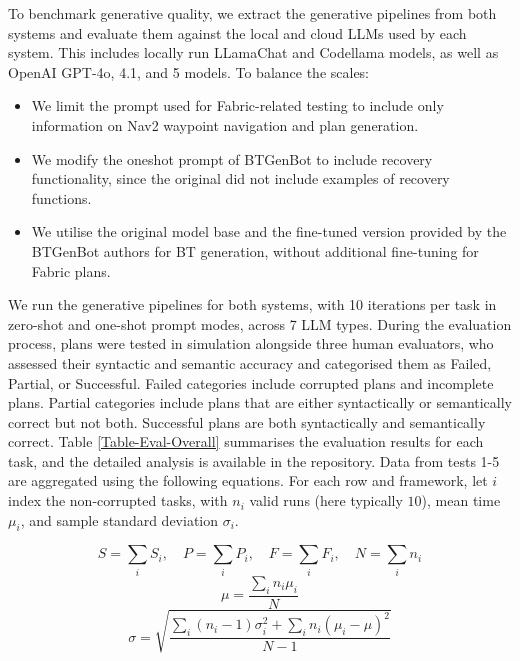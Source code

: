 \documentclass[letterpaper, 10pt, conference]{ieeeconf}      %
\begin{document}
To benchmark generative quality, we extract the generative pipelines from both systems and evaluate them against the local and cloud LLMs used by each system. This includes locally run LLamaChat and Codellama models, as well as OpenAI GPT-4o, 4.1, and 5 models. To balance the scales:

\begin{itemize}
    \item We limit the prompt used for Fabric-related testing to include only information on Nav2 waypoint navigation and plan generation.
    \item We modify the oneshot prompt of BTGenBot to include recovery functionality, since the original did not include examples of recovery functions.
    \item We utilise the original model base and the fine-tuned version provided by the BTGenBot authors for BT generation, without additional fine-tuning for Fabric plans.
\end{itemize}

We run the generative pipelines for both systems, with 10 iterations per task in zero-shot and one-shot prompt modes, across 7 LLM types. During the evaluation process, plans were tested in simulation alongside three human evaluators, who assessed their syntactic and semantic accuracy and categorised them as Failed, Partial, or Successful. Failed categories include corrupted plans and incomplete plans. Partial categories include plans that are either syntactically or semantically correct but not both. Successful plans are both syntactically and semantically correct. Table \ref{Table-Eval-Overall} summarises the evaluation results for each task, and the detailed analysis is available in the repository. Data from tests 1-5 are aggregated using the following equations. For each row and framework, let $i$ index the non-corrupted tasks, with $n_i$ valid runs (here typically $10$), mean time $\mu_i$, and sample standard deviation $\sigma_i$.

\begin{equation}
S=\sum_i S_i, \quad P=\sum_i P_i, \quad F=\sum_i F_i, \quad N=\sum_i n_i
\end{equation}
\begin{equation}
\mu=\frac{\sum_i n_i\mu_i}{N}
\end{equation}
\begin{equation}
\sigma=\sqrt{\frac{\sum_i (n_i-1)\sigma_i^2 + \sum_i n_i(\mu_i-\mu)^2}{N-1} }
\end{equation}
\end{document}

